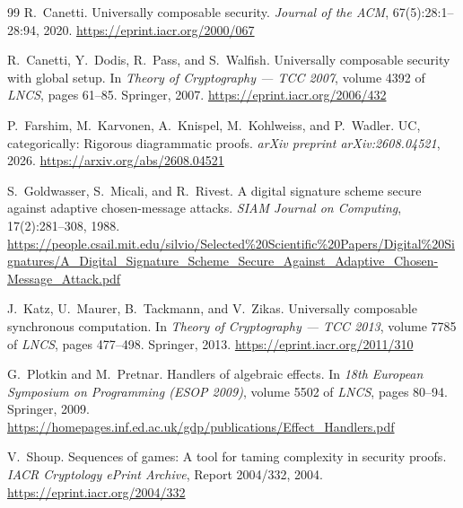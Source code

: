 \documentclass[10pt,oneside,openany]{book}
\newcounter{diagram}
\theoremstyle{accentdef}
\theoremstyle{accentplain}
\begin{document}
\begin{thebibliography}{99}
R.~Canetti.
\newblock Universally composable security.
\newblock \emph{Journal of the ACM}, 67(5):28:1--28:94, 2020.
\newblock \url{https://eprint.iacr.org/2000/067}

R.~Canetti, Y.~Dodis, R.~Pass, and S.~Walfish.
\newblock Universally composable security with global setup.
\newblock In \emph{Theory of Cryptography --- TCC 2007}, volume 4392 of \emph{LNCS}, pages 61--85.
Springer, 2007.
\newblock \url{https://eprint.iacr.org/2006/432}

P.~Farshim, M.~Karvonen, A.~Knispel, M.~Kohlweiss, and P.~Wadler.
\newblock UC, categorically: Rigorous diagrammatic proofs.
\newblock \emph{arXiv preprint arXiv:2608.04521}, 2026.
\newblock \url{https://arxiv.org/abs/2608.04521}

S.~Goldwasser, S.~Micali, and R.~Rivest.
\newblock A digital signature scheme secure against adaptive chosen-message attacks.
\newblock \emph{SIAM Journal on Computing}, 17(2):281--308, 1988.
\newblock \url{https://people.csail.mit.edu/silvio/Selected\%20Scientific\%20Papers/Digital\%20Signatures/A_Digital_Signature_Scheme_Secure_Against_Adaptive_Chosen-Message_Attack.pdf}

J.~Katz, U.~Maurer, B.~Tackmann, and V.~Zikas.
\newblock Universally composable synchronous computation.
\newblock In \emph{Theory of Cryptography --- TCC 2013}, volume 7785 of \emph{LNCS}, pages
477--498. Springer, 2013.
\newblock \url{https://eprint.iacr.org/2011/310}

G.~Plotkin and M.~Pretnar.
\newblock Handlers of algebraic effects.
\newblock In \emph{18th European Symposium on Programming (ESOP 2009)}, volume 5502 of
\emph{LNCS}, pages 80--94. Springer, 2009.
\newblock \url{https://homepages.inf.ed.ac.uk/gdp/publications/Effect_Handlers.pdf}

V.~Shoup.
\newblock Sequences of games: A tool for taming complexity in security proofs.
\newblock \emph{IACR Cryptology ePrint Archive}, Report 2004/332, 2004.
\newblock \url{https://eprint.iacr.org/2004/332}

\end{thebibliography}
\end{document}
